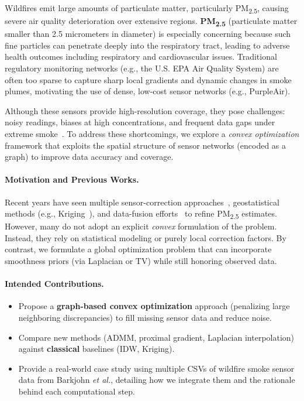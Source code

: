 \documentclass[12pt]{article}                                %
\begin{document}
Wildfires emit large amounts of particulate matter, particularly PM\textsubscript{2.5}, causing 
severe air quality deterioration over extensive regions. 
\textbf{PM\textsubscript{2.5}} (particulate matter smaller than 2.5 micrometers in diameter) 
is especially concerning because such fine particles can penetrate deeply into the respiratory 
tract, leading to adverse health outcomes including respiratory and cardiovascular issues. 
Traditional regulatory monitoring networks (e.g., the U.S. EPA Air Quality System) are often 
too sparse to capture sharp local gradients and dynamic changes in smoke plumes, motivating 
the use of dense, low-cost sensor networks (e.g., PurpleAir).                                     %

Although these sensors provide high-resolution coverage, they pose challenges: noisy readings, 
biases at high concentrations, and frequent data gaps under extreme smoke~\cite{Barkjohn2022, 
PurpleAirUseCases}. To address these shortcomings, we explore a \textit{convex optimization} 
framework that exploits the spatial structure of sensor networks (encoded as a graph) to 
improve data accuracy and coverage.                                                               %

\paragraph{Motivation and Previous Works.} %
Recent years have seen multiple sensor-correction approaches~\cite{Barkjohn2022Sensors}, 
geostatistical methods (e.g., Kriging~\cite{ChilesDelfiner}), and data-fusion 
efforts~\cite{rapidfireGithub,rapidfireSupportCode} to refine PM\textsubscript{2.5} estimates. 
However, many do not adopt an explicit \emph{convex} formulation of the problem. Instead, 
they rely on statistical modeling or purely local correction factors. By contrast, we 
formulate a global optimization problem that can incorporate smoothness priors 
(via Laplacian or TV) while still honoring observed data.

\paragraph{Intended Contributions.}  %
\begin{itemize}
    \item Propose a \textbf{graph-based convex optimization} approach (penalizing large 
    neighboring discrepancies) to fill missing sensor data and reduce noise.
    \item Compare new methods (ADMM, proximal gradient, Laplacian interpolation) against 
    \textbf{classical} baselines (IDW, Kriging).
    \item Provide a real-world case study using multiple CSVs of wildfire smoke sensor 
    data from Barkjohn \emph{et al.}, detailing how we integrate them and the 
    rationale behind each computational step.
\end{itemize}
\end{document}
